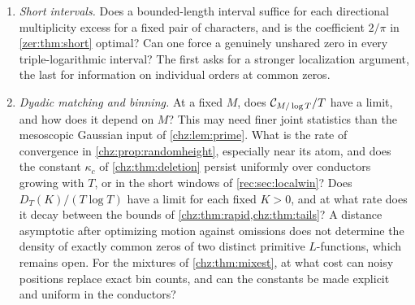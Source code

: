 \begin{enumerate}
polynomial discounts of \cref{rec:cor:blurend} and arbitrary subcritical exponential moments, still force
identification? For other families of $L$-functions, which gamma and pole profiles survive after a positive law
removes the arithmetic atoms?
\item \emph{Short intervals.} Does a bounded-length interval suffice for each directional
multiplicity excess for a fixed pair of characters, and is the coefficient $2/\pi$ in
\cref{zer:thm:short} optimal? Can one force a genuinely unshared zero in every
triple-logarithmic interval? The first asks for a stronger localization argument, the last
for information on individual orders at common zeros.
\item \emph{Dyadic matching and binning.} At a fixed $M$, does $\mathcal{C}_{M/\log T}/T$ have a limit, and how does it depend
on $M$? This may need finer joint statistics than the mesoscopic Gaussian input of \cref{chz:lem:prime}. What is the
rate of convergence in \cref{chz:prop:randomheight}, especially near its atom, and does the constant $\kappa_c$ of
\cref{chz:thm:deletion} persist uniformly over conductors growing with $T$, or in the short windows of
\cref{rec:sec:localwin}? Does $D_T(K)/(T\log T)$ have a limit for each fixed $K>0$, and at what rate does it decay
between the bounds of \cref{chz:thm:rapid,chz:thm:tails}? A distance asymptotic after optimizing motion against
omissions does not determine the density of exactly common zeros of two distinct primitive $L$-functions, which
remains open. For the mixtures of \cref{chz:thm:mixest}, at what cost can noisy positions replace exact bin counts,
and can the constants be made explicit and uniform in the conductors?
\end{enumerate}
